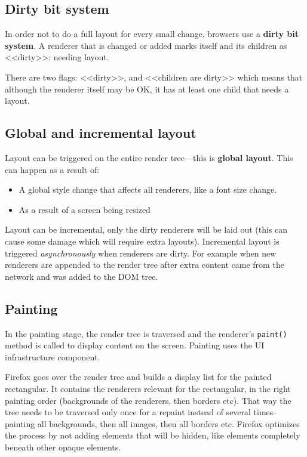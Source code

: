\documentclass[a4paper, justified, notoc]{tufte-handout} %
\begin{document}
\subsection{Dirty bit system} %
\label{sub:dirty_bit_system}
In order not to do a full layout for every small change, browsers use a \textbf{dirty bit system}. A renderer that is changed or added marks itself and its children as <<dirty>>: needing layout.

There are two flags: <<dirty>>, and <<children are dirty>> which means that although the renderer itself may be OK, it has at least one child that needs a layout.

\subsection{Global and incremental layout} %
\label{sub:global_and_incremental_layout}
Layout can be triggered on the entire render tree---this is \textbf{global layout}. This can happen as a result of:
\begin{itemize}
	\item A global style change that affects all renderers, like a font size change.
	\item As a result of a screen being resized
\end{itemize}
Layout can be incremental, only the dirty renderers will be laid out (this can cause some damage which will require extra layouts). 
Incremental layout is triggered \emph{asynchronously} when renderers are dirty. For example when new renderers are appended to the render tree after extra content came from the network and was added to the DOM tree.

\subsection{Painting} %
\label{sub:painting}
In the painting stage, the render tree is traversed and the renderer's \texttt{paint()} method is called to display content on the screen. Painting uses the UI infrastructure component.

Firefox goes over the render tree and builds a display list for the painted rectangular. It contains the renderers relevant for the rectangular, in the right painting order (backgrounds of the renderers, then borders etc). That way the tree needs to be traversed only once for a repaint instead of several times–painting all backgrounds, then all images, then all borders etc.
Firefox optimizes the process by not adding elements that will be hidden, like elements completely beneath other opaque elements.
\end{document}
